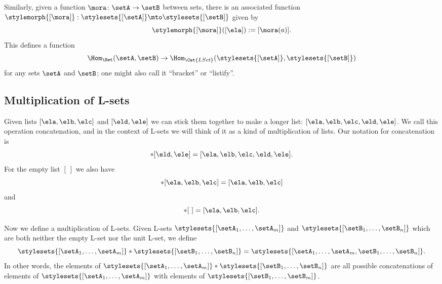 Similarly, given a function $\mora \colon \setA \to \setB$ between sets, there is an associated function $\stylemorph{[ \mora ]}: \stylesets{[\setA]} \mto \stylesets{[\setB]}$ given by 
\begin{equation}
\stylemorph{[ \mora ]} ([ \ela ]) := [\mora(a)].
\end{equation}
This defines a function 
\begin{equation}
\Hom_{\Set}(\setA,\setB) \to \Hom_{\Cat{LSet}}(\stylesets{[\setA]},\stylesets{[\setB]})
\end{equation}
for any sets $\setA$ and $\setB$; one might also call it ``bracket'' or ``listify''.





\subsection{Multiplication of L-sets}

Given lists $[\ela, \elb, \elc]$ and $[\eld, \ele]$ we can stick them together to make a longer list: $[\ela, \elb, \elc, \eld, \ele]$.
We call this operation concatenation, and in the context of L-sets we will think of it as a kind of multiplication of lists.
Our notation for concatenation is
\begin{equation}
    [\ela, \elb, \elc] * [\eld, \ele] = [\ela, \elb, \elc, \eld, \ele].
\end{equation}
For the empty list $[ \ ]$ we also have
\begin{equation}
    [ \ ] * [\ela, \elb, \elc]  = [\ela, \elb, \elc]
\end{equation}
and
\begin{equation}
    [\ela, \elb, \elc]  * [ \ ] = [\ela, \elb, \elc].
\end{equation}

Now we define a multiplication of L-sets.
Given L-sets $\stylesets{[\setA_1, \dots, \setA_m]}$ and $\stylesets{[\setB_1,  \dots, \setB_n]}$ which are both neither the empty L-set nor the unit L-set, we define
\begin{equation}
    \stylesets{[\setA_1, \dots, \setA_m]} * \stylesets{[\setB_1, \dots, \setB_n]} = \stylesets{[\setA_1, \dots, \setA_m, \setB_1,  \dots, \setB_n]}.
\end{equation}
In other words, the elements of $\stylesets{[\setA_1, \dots, \setA_m]} * \stylesets{[\setB_1, \dots, \setB_n]}$ are all possible concatenations of elements of $\stylesets{[\setA_1, \dots, \setA_m]}$ with elements of $\stylesets{[\setB_1, \dots, \setB_m]}$.


